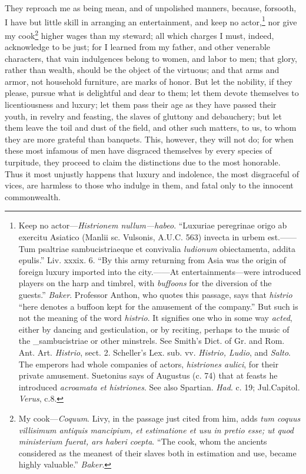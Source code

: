 They reproach me as being mean, and of unpolished manners, because,
forsooth, I have but little skill in arranging an entertainment, and
keep no actor,\footnote{Keep no actor—\emph{Histrionem nullum—habeo}. ``Luxuriae peregrinae
origo ab exercitu Asiatico (Manlii sc. Vulsonis, A.U.C. 563) invecta
in urbem est.——Tum psaltriae sambucistriaeque et convivalia
\emph{ludionum} obiectamenta, addita epulis.'' Liv. xxxix. 6. ``By this army
returning from Asia was the origin of foreign luxury imported into the
city.——At entertainments—were introduced players on the harp and
timbrel, with \emph{buffoons} for the diversion of the guests.'' \emph{Baker}.
Professor Anthon, who quotes this passage, says that \emph{histrio} ``here
denotes a buffoon kept for the amusement of the company.'' But such is
not the meaning of the word \emph{histrio}. It signifies one who in some way
\emph{acted}, either by dancing and gesticulation, or by reciting, perhaps
to the music of the \_sambucistriae or other minstrels. See Smith's
Dict. of Gr. and Rom. Ant. Art. \emph{Histrio}, sect. 2. Scheller's Lex.
sub. vv. \emph{Histrio, Ludio}, and \emph{Salto}. The emperors had whole companies
of actors, \emph{histriones aulici}, for their private amusement. Suetonius
says of Augustus (c. 74) that at feasts he introduced \emph{acroamata et
histriones}. See also Spartian. \emph{Had}. c. 19; Jul.Capitol. \emph{Verus}, c.8.} nor give my cook\footnote{My cook—\emph{Coquum}. Livy, in the passage just cited from him, adds
\emph{tum coquus villisimum antiquis mancipium, et estimatione et usu in
pretio esse; ut quod ministerium fuerat, ars haberi coepta}. ``The cook,
whom the ancients considered as the meanest of their slaves both in
estimation and use, became highly valuable.'' \emph{Baker}.} higher wages than my
steward; all which charges I must, indeed, acknowledge to be just; for
I learned from my father, and other venerable characters, that vain
indulgences belong to women, and labor to men; that glory, rather than
wealth, should be the object of the virtuous; and that arms and armor,
not household furniture, are marks of honor. But let the nobility, if
they please, pursue what is delightful and dear to them; let them
devote themselves to licentiousness and luxury; let them pass their
age as they have passed their youth, in revelry and feasting, the
slaves of gluttony and debauchery; but let them leave the toil and
dust of the field, and other such matters, to us, to whom they are
more grateful than banquets. This, however, they will not do; for when
these most infamous of men have disgraced themselves by every species
of turpitude, they proceed to claim the distinctions due to the most
honorable. Thus it most unjustly happens that luxury and indolence,
the most disgraceful of vices, are harmless to those who indulge in
them, and fatal only to the innocent commonwealth.

